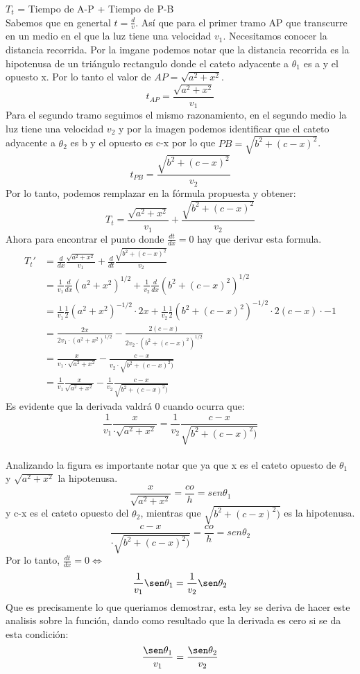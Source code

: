 \documentclass[12pt]{article}
\begin{document}
$T_t$ = Tiempo de A-P + Tiempo de P-B\\
Sabemos que en genertal $t = \frac{d}{v}$.
Así que para el primer tramo AP que transcurre en un medio en el que la luz tiene una velocidad $v_1$. Necesitamos conocer la distancia recorrida. Por la imgane podemos notar que la distancia recorrida es la hipotenusa de un triángulo rectangulo donde el cateto adyacente a $\theta_1$ es a y el opuesto x. Por lo tanto el valor de $AP= \sqrt{a^2+x^2}$. 
\[
t_{AP}= \frac{\sqrt{a^2+x^2}}{v_1}
\]
Para el segundo tramo seguimos el mismo razonamiento, en el segundo medio la luz tiene una velocidad $v_2$ y por la imagen podemos identificar que el cateto adyacente a $\theta_2$ es b y el opuesto es c-x por lo que $PB= \sqrt{b^2 + (c-x)^2}$.
\[
t_{PB}= \frac{\sqrt{b^2 + (c-x)^2}}{v_2}
\]
Por lo tanto, podemos remplazar en la fórmula propuesta y obtener:
\[
T_t= \frac{\sqrt{a^2+x^2}}{v_1} +  \frac{\sqrt{b^2 + (c-x)^2}}{v_2}
\]
Ahora para encontrar el punto donde $\frac{dt}{dx}=0$ hay que derivar esta formula.
\begin{align*}
  T_t'
  &=  \frac{d}{dx} \frac{\sqrt{a^2+x^2}}{v_1} +  \frac{d}{dt} \frac{\sqrt{b^2 + (c-x)^2}}{v_2}\\
  &= \frac{1}{v_1} \frac{d}{dx} (a^2+x^2)^{1/2}+\frac{1}{v_2} \frac{d}{dx}  (b^2 +(c-x)^2)^{1/2}\\
  &= \frac{1}{v_1} \frac{1}{2} (a^2+x^2)^{-1/2} \cdot 2x + \frac{1}{v_2} \frac{1}{2}  (b^2 +(c-x)^2)^{-1/2} \cdot 2(c-x) \cdot -1\\
  &= \frac{2x}{2v_1  \cdot (a^{2} + x^{2})^{1/2}}  - \frac{2(c-x)}{2v_2\cdot (b^2 +(c-x)^2)^{1/2} }\\
  &= \frac{x}{v_1  \cdot \sqrt{a^{2} + x^{2}}}  - \frac{c-x}{v_2\cdot \sqrt {b^2 +(c-x)^2)} } \\
  &= \frac{1}{v_1}\frac{x}{  \sqrt{a^{2} + x^{2}}}  - \frac{1}{v_2}\frac{c-x}{ \sqrt {b^2 +(c-x)^2)} } 
\end{align*}
Es evidente que la derivada valdrá 0 cuando ocurra que:
\[
 \frac{1}{v_1}\frac{x}{ \cdot \sqrt{a^{2} + x^{2}}}  =  \frac{1}{v_2}\frac{c-x}{ \sqrt {b^2 +(c-x)^2)} }  
 \]
 \\
Analizando la figura es importante notar que ya que x es el cateto opuesto de $\theta_1$ y  $\sqrt{a^{2} + x^{2}} $ la hipotenusa.
\[
\frac{x}{  \sqrt{a^{2} + x^{2}}} = \frac{co}{h} = sen\theta_1
\]
y c-x es el cateto opuesto del  $\theta_2$, mientras que $\sqrt {b^2 +(c-x)^2)}$ es la hipotenusa.
\[
\frac{c-x}{\cdot \sqrt {b^2 +(c-x)^2)} }  = \frac{co}{h} = sen\theta_2  
\]
Por lo tanto, $\frac{dt}{dx}=0 \iff$
\[
 \frac{1}{v_1}\sen\theta_1  =  \frac{1}{v_2}\sen\theta_2
 \]
 Que es precisamente lo que queriamos demostrar, esta ley se deriva de hacer este analisis sobre la función, dando como resultado que la derivada es cero si se da esta condición:
 \[
 \frac{\sen\theta_1}{v_1}  =  \frac{\sen\theta_2}{v_2}
 \]
\end{document}
